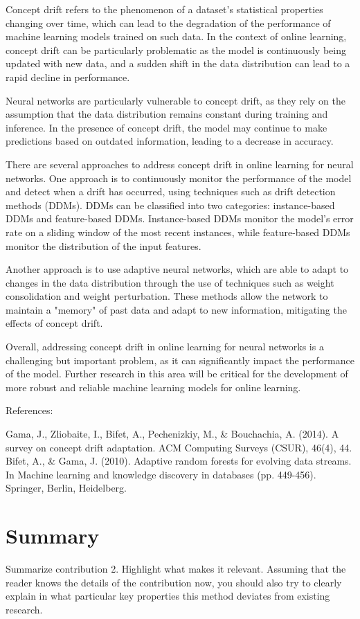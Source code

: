 Concept drift refers to the phenomenon of a dataset's statistical properties changing over time, which can lead to the degradation of the performance of machine learning models trained on such data. In the context of online learning, concept drift can be particularly problematic as the model is continuously being updated with new data, and a sudden shift in the data distribution can lead to a rapid decline in performance.

Neural networks are particularly vulnerable to concept drift, as they rely on the assumption that the data distribution remains constant during training and inference. In the presence of concept drift, the model may continue to make predictions based on outdated information, leading to a decrease in accuracy.

There are several approaches to address concept drift in online learning for neural networks. One approach is to continuously monitor the performance of the model and detect when a drift has occurred, using techniques such as drift detection methods (DDMs). DDMs can be classified into two categories: instance-based DDMs and feature-based DDMs. Instance-based DDMs monitor the model's error rate on a sliding window of the most recent instances, while feature-based DDMs monitor the distribution of the input features.

Another approach is to use adaptive neural networks, which are able to adapt to changes in the data distribution through the use of techniques such as weight consolidation and weight perturbation. These methods allow the network to maintain a "memory" of past data and adapt to new information, mitigating the effects of concept drift.

Overall, addressing concept drift in online learning for neural networks is a challenging but important problem, as it can significantly impact the performance of the model. Further research in this area will be critical for the development of more robust and reliable machine learning models for online learning.

References:

Gama, J., Zliobaite, I., Bifet, A., Pechenizkiy, M., & Bouchachia, A. (2014). A survey on concept drift adaptation. ACM Computing Surveys (CSUR), 46(4), 44.
Bifet, A., & Gama, J. (2010). Adaptive random forests for evolving data streams. In Machine learning and knowledge discovery in databases (pp. 449-456). Springer, Berlin, Heidelberg.


\section{Summary}
\label{s:Contribution-2-Summary}

Summarize contribution 2. Highlight what makes it relevant. Assuming that the reader knows the details of the contribution now, you should also try to clearly explain in what particular key properties this method deviates from existing research.
